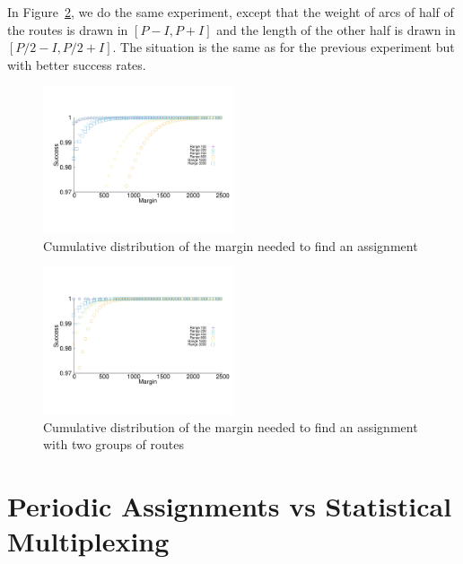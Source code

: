 \documentclass[a4paper,10pt]{article}
\begin{document}
     In Figure~\ref{fig:2grp}, we do the same experiment, except that the weight of arcs of half of the routes is drawn in $[P-I,P+I]$ and the length of the other half is drawn in $[P/2-I,P/2 + I]$. The situation is the same as for the previous experiment but with better success rates. 

          
              \begin{figure}
       \begin{center}
      \includegraphics[width = 0.5\textwidth]{departs_distrib1Grp.pdf}
      \end{center}
      \caption{Cumulative distribution of the margin needed to find an assignment}
      \label{fig:1grp}   
     \end{figure}    
     
                \begin{figure}
       \begin{center}
      \includegraphics[width = 0.5\textwidth]{departs_distrib2Grp.pdf}
      \end{center}
    \caption{Cumulative distribution of the margin needed to find an assignment with two groups of routes}
      \label{fig:2grp}   
     \end{figure}    
     
     

\section{Periodic Assignments vs Statistical Multiplexing}\label{sec:comparison}
\end{document}
